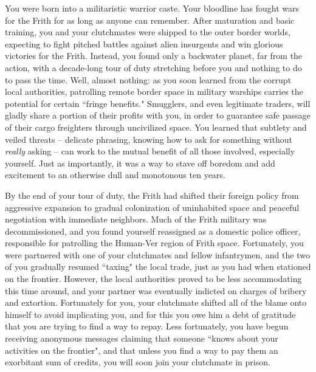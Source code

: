 \documentclass[char]{guildcamp4}
\begin{document}
\name{\cCbad{}}

You were born into a militaristic warrior caste. Your bloodline has fought wars for the Frith for as long as anyone can remember. After maturation and basic training, you and your clutchmates were shipped to the outer border worlds, expecting to fight pitched battles against alien insurgents and win glorious victories for the Frith. Instead, you found only a backwater planet, far from the action, with a decade-long tour of duty stretching before you and nothing to do to pass the time. Well, almost nothing: as you soon learned from the corrupt local authorities, patrolling remote border space in military warships carries the potential for certain ``fringe benefits." Smugglers, and even legitimate traders, will gladly share a portion of their profits with you, in order to guarantee safe passage of their cargo freighters through uncivilized space. You learned that subtlety and veiled threats -- delicate phrasing, knowing how to ask for something without \textit{really} asking -- can work to the mutual benefit of all those involved, especially yourself. Just as importantly, it was a way to stave off boredom and add excitement to an otherwise dull and monotonous ten years.

By the end of your tour of duty, the Frith had shifted their foreign policy from aggressive expansion to gradual colonization of uninhabited space and peaceful negotiation with immediate neighbors. Much of the Frith military was decommissioned, and you found yourself reassigned as a domestic police officer, responsible for patrolling the Human-Ver region of Frith space. Fortunately, you were partnered with one of your clutchmates and fellow infantrymen, and the two of you gradually resumed ``taxing" the local trade, just as you had when stationed on the frontier. However, the local authorities proved to be less accommodating this time around, and your partner was eventually indicted on charges of bribery and extortion. Fortunately for you, your clutchmate shifted all of the blame onto himself to avoid implicating you, and for this you owe him a debt of gratitude that you are trying to find a way to repay. Less fortunately, you have begun receiving anonymous messages claiming that someone ``knows about your activities on the frontier", and that unless you find a way to pay them an exorbitant sum of credits, you will soon join your clutchmate in prison.
\end{document}
